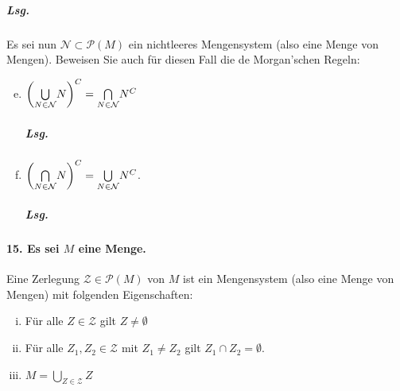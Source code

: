 \documentclass{scrreprt}
\begin{document}
\begin{enumerate}[(a)]
  \subparagraph{Lsg.}
\end{enumerate}
\newpage
Es sei nun $\mathcal{N} \subset \mathcal{P}(M)$ ein nichtleeres Mengensystem
(also eine Menge von Mengen).
Beweisen Sie auch für diesen Fall die de Morgan'schen Regeln:
\begin{enumerate}[(a)]
\setcounter{enumi}{4}
\item $\qty(\underset{N \in \mathcal{N}}\bigcup N)^C
  = \underset{N \in \mathcal{N}}\bigcap N^C$
  \subparagraph{Lsg.}

\item $\qty(\underset{N \in \mathcal{N}}\bigcap N)^C
  = \underset{N \in \mathcal{N}}\bigcup N^C$.

  \subparagraph{Lsg.}
\end{enumerate}

\newpage
\paragraph{15. Es sei $M$ eine Menge.}
Eine Zerlegung $\mathcal{Z} \in \mathcal{P}(M)$ von $M$ ist ein Mengensystem
(also eine Menge von Mengen) mit folgenden Eigenschaften:
\begin{enumerate}[(i)]
\item Für alle $Z \in \mathcal{Z}$ gilt $Z \ne \emptyset$
\item Für alle $Z_1, Z_2 \in \mathcal{Z}$ mit $Z_1 \ne Z_2$ gilt
  $Z_1 \cap Z_2 = \emptyset$.
\item $M = \underset{Z \in \mathcal{Z}}\bigcup Z$
\end{enumerate}
\end{document}
